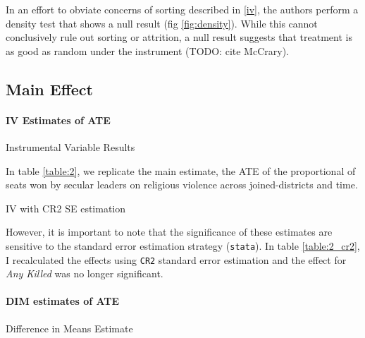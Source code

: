 \documentclass{scrartcl}
\begin{document}
In an effort to obviate concerns of sorting described in \ref{iv}, the authors perform a density test that shows a null result (fig \ref{fig:density}).
While this cannot conclusively rule out sorting or attrition, a null result suggests that treatment is as good as random under the instrument (TODO: cite McCrary). 

\subsection{Main Effect}

\paragraph{IV Estimates of ATE} \label{ate:iv}

\begin{table}[ht]
  \begin{center}
    \scalebox{0.75}{
      
    }
    \caption{Instrumental Variable Results}
    \label{table:2}
  \end{center}
\end{table}

In table \ref{table:2}, we replicate the main estimate, the ATE of the proportional of seats won by secular leaders on religious violence across joined-districts and time. 

\begin{table}[ht]
  \begin{center}
    \scalebox{0.75}{
      
    }
    \caption{IV with CR2 SE estimation}
    \label{table:2_cr2}
  \end{center}
\end{table}

However, it is important to note that the significance of these estimates are sensitive to the standard error estimation strategy (\texttt{stata}).
In table \ref{table:2_cr2}, I recalculated the effects using \texttt{CR2} standard error estimation and the effect for \textit{Any Killed} was no longer significant.

\paragraph{DIM estimates of ATE}

\begin{table}[ht]
  \begin{center}
    \scalebox{0.75}{
      
    }
    \caption{Difference in Means Estimate}
    \label{table:3}
  \end{center}
\end{table}
\end{document}

